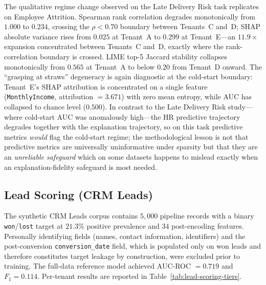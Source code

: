 The qualitative regime change observed on the Late Delivery Risk task
replicates on Employee Attrition. Spearman rank correlation degrades
monotonically from $1.000$ to $0.234$, crossing the $\rho < 0.70$
boundary between Tenants~C and~D; SHAP absolute variance rises from
$0.025$ at Tenant~A to $0.299$ at Tenant~E---an $11.9\times$ expansion
concentrated between Tenants~C and~D, exactly where the rank-correlation
boundary is crossed. LIME top-5 Jaccard stability collapses monotonically
from $0.565$ at Tenant~A to below $0.20$ from Tenant~D onward. The
``grasping at straws'' degeneracy is again diagnostic at the cold-start
boundary: Tenant~E's SHAP attribution is concentrated on a single
feature (\texttt{MonthlyIncome}, attribution $= 3.671$) with zero
mean entropy, while AUC has collapsed to chance level ($0.500$). In
contrast to the Late Delivery Risk study---where cold-start AUC was
anomalously high---the HR predictive trajectory degrades together with
the explanation trajectory, so on this task predictive metrics
\emph{would} flag the cold-start regime; the methodological lesson is
not that predictive metrics are universally uninformative under
sparsity but that they are an \emph{unreliable safeguard} which on
some datasets happens to mislead exactly when an explanation-fidelity
safeguard is most needed.

\subsection{Lead Scoring (CRM Leads)}
\label{subsec:lead-scoring-replication}

The synthetic CRM Leads corpus contains $5{,}000$ pipeline records
with a binary \texttt{won}/\texttt{lost} target at $21.3\%$ positive
prevalence and $34$ post-encoding features. Personally identifying
fields (names, contact information, identifiers) and the
post-conversion \texttt{conversion\_date} field, which is populated
only on won leads and therefore constitutes target leakage by
construction, were excluded prior to training. The full-data
reference model achieved AUC-ROC $= 0.719$ and $F_1 = 0.114$.
Per-tenant results are reported in
Table~\ref{tab:lead-scoring-tiers}.

